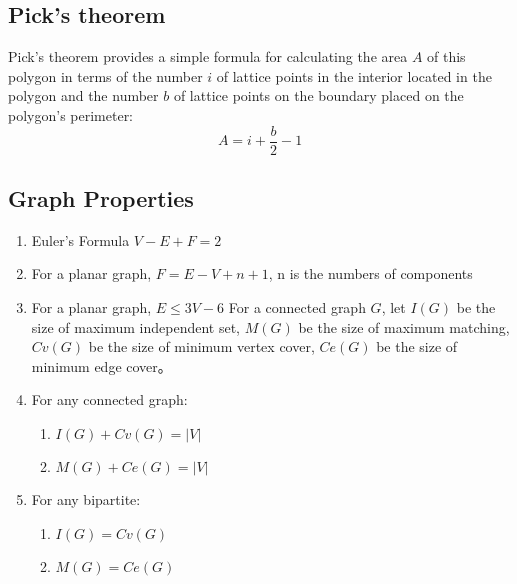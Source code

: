 %

\subsection{Pick's theorem}
Pick's theorem provides a simple formula for calculating the area $A$ of this polygon in terms of the number $i$ of lattice points in the interior located in the polygon and the number $b$ of lattice points on the boundary placed on the polygon's perimeter:
$$A = i + \frac{b}{2} - 1$$

\subsection{Graph Properties}
\begin{enumerate}\itemsep = -5pt
\item Euler's Formula $V-E+F=2$
\item For a planar graph, $F=E-V+n+1$, n is the numbers of components
\item For a planar graph, $E\leq 3V-6$
For a connected graph $G$, let $I(G)$ be the size of maximum independent set, $M(G)$ be the size of maximum matching, $Cv(G)$ be the size of minimum vertex cover, $Ce(G)$ be the size of minimum edge cover。
\item For any connected graph:
  \begin{enumerate}\itemsep = -3pt
  \item $I(G)+Cv(G)=|V|$
  \item $M(G)+Ce(G)=|V|$
  \end{enumerate}
\item For any bipartite:
  \begin{enumerate}\itemsep = -3pt
  \item $I(G)=Cv(G)$
  \item $M(G)=Ce(G)$

\end{enumerate}
\end{enumerate}
